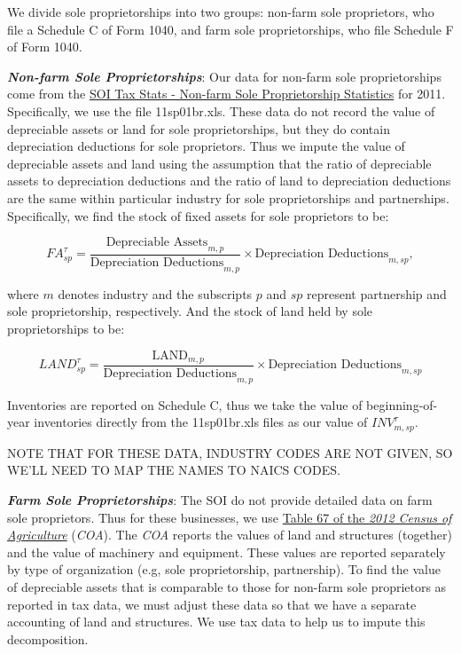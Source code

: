 \documentclass[article,11pt,letterpaper,fleqn]{article}
\theoremstyle{definition}
\numberwithin{equation}{section}
\begin{document}
We divide sole proprietorships into two groups: non-farm sole proprietors, who file a Schedule C of Form 1040, and farm sole proprietorships, who file Schedule F of Form 1040.  

\textbf{\emph{Non-farm Sole Proprietorships}}:  Our data for non-farm sole proprietorships come from the \href{http://www.irs.gov/uac/SOI-Tax-Stats-Nonfarm-Sole-Proprietorship-Statistics}{SOI Tax Stats - Non-farm Sole Proprietorship Statistics} for 2011.  Specifically, we use the file 11sp01br.xls.  These data do not record the value of depreciable assets or land for sole proprietorships, but they do contain depreciation deductions for sole proprietors.  Thus we impute the value of depreciable assets and land using the assumption that the ratio of depreciable assets to depreciation deductions and the ratio of land to depreciation deductions are the same within particular industry for sole proprietorships and partnerships.  Specifically, we find the stock of fixed assets for sole proprietors to be: 

\begin{equation}
{FA}^{\tau}_{sp}=\frac{\text{Depreciable Assets}_{m,p}}{\text{Depreciation Deductions}_{m,p}}\times \text{Depreciation Deductions}_{m,sp},
\end{equation}

\noindent\noindent where $m$ denotes industry and the subscripts $p$ and $sp$ represent partnership and sole proprietorship, respectively.  And the stock of land held by sole proprietorships to be: 

\begin{equation}
{LAND}^{\tau}_{sp}=\frac{\text{LAND}_{m,p}}{\text{Depreciation Deductions}_{m,p}}\times \text{Depreciation Deductions}_{m,sp}
\end{equation}

Inventories are reported on Schedule C, thus we take the value of beginning-of-year inventories directly from the 11sp01br.xls files as our value of ${INV}^{\tau}_{m,sp}$.

NOTE THAT FOR THESE DATA, INDUSTRY CODES ARE NOT GIVEN, SO WE'LL NEED TO MAP THE NAMES TO NAICS CODES.

\textbf{\emph{Farm Sole Proprietorships}}:  The SOI do not provide detailed data on farm sole proprietors.  Thus for these businesses, we use \href{http://www.agcensus.usda.gov/Publications/2012/Full_Report/Volume_1,_Chapter_1_US/st99_1_067_067.pdf}{Table 67 of the \emph{2012 Census of Agriculture}} (\emph{COA}).  The \emph{COA} reports the values of land and structures (together) and the value of machinery and equipment.  These values are reported separately by type of organization (e.g, sole proprietorship, partnership).  To find the value of depreciable assets that is comparable to those for non-farm sole proprietors as reported in tax data, we must adjust these data so that we have a separate accounting of land and structures.  We use tax data to help us to impute this decomposition.  
\end{document}
